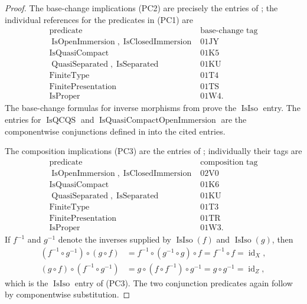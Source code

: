 \begin{proof}
  The base-change implications (PC2) are precisely the entries of
  \cite[\href{https://stacks.math.columbia.edu/tag/02WF}{Tag 02WF}]
  {stacks-project}; the individual references for the predicates in (PC1) are
  \[
  \begin{array}{c|c}
    \text{predicate}&\text{base-change tag}\\ \hline
    \operatorname{IsOpenImmersion},\operatorname{IsClosedImmersion}
      &\text{01JY}\\
    \operatorname{IsQuasiCompact}&\text{01K5}\\
    \operatorname{QuasiSeparated},\operatorname{IsSeparated}&\text{01KU}\\
    \operatorname{FiniteType}&\text{01T4}\\
    \operatorname{FinitePresentation}&\text{01TS}\\
    \operatorname{IsProper}&\text{01W4}.
  \end{array}                                                       \tag{PC13}
  \]
  The base-change formulas for inverse morphisms from
  \cite[\href{https://stacks.math.columbia.edu/tag/0017}{Tag 0017}]
  {stacks-project} prove the $\operatorname{IsIso}$ entry.  The entries for
  $\operatorname{IsQCQS}$ and
  $\operatorname{IsQuasiCompactOpenImmersion}$ are the componentwise
  conjunctions defined in
   into the cited entries.

  The composition implications (PC3) are the entries of
  \cite[\href{https://stacks.math.columbia.edu/tag/02WG}{Tag 02WG}]
  {stacks-project}; individually their tags are
  \[
  \begin{array}{c|c}
    \text{predicate}&\text{composition tag}\\ \hline
    \operatorname{IsOpenImmersion},\operatorname{IsClosedImmersion}
      &\text{02V0}\\
    \operatorname{IsQuasiCompact}&\text{01K6}\\
    \operatorname{QuasiSeparated},\operatorname{IsSeparated}&\text{01KU}\\
    \operatorname{FiniteType}&\text{01T3}\\
    \operatorname{FinitePresentation}&\text{01TR}\\
    \operatorname{IsProper}&\text{01W3}.
  \end{array}                                                       \tag{PC14}
  \]
  If $f^{-1}$ and $g^{-1}$ denote the inverses supplied by
  $\operatorname{IsIso}(f)$ and $\operatorname{IsIso}(g)$, then
  \[
  \begin{aligned}
    (f^{-1}\circ g^{-1})\circ(g\circ f)
      &=f^{-1}\circ(g^{-1}\circ g)\circ f
       =f^{-1}\circ f=\operatorname{id}_X,\\
    (g\circ f)\circ(f^{-1}\circ g^{-1})
      &=g\circ(f\circ f^{-1})\circ g^{-1}
       =g\circ g^{-1}=\operatorname{id}_Z,
  \end{aligned}
  \]
  which is the $\operatorname{IsIso}$ entry of (PC3).  The two conjunction
  predicates again follow by componentwise substitution.


\end{proof}
